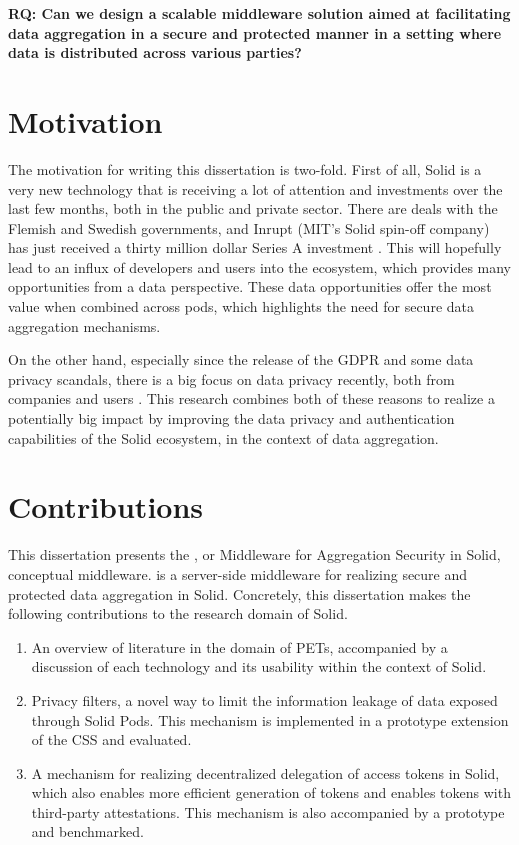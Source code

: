\noindent \textbf{RQ: Can we design a scalable middleware solution aimed at facilitating data aggregation in a secure and protected manner in a setting where data is distributed across various parties?
}

\section{Motivation}
\label{sec:motivation}
The motivation for writing this dissertation is two-fold. First of all, Solid is a very new technology that is receiving a lot of attention and investments over the last few months, both in the public and private sector. There are deals with the Flemish  and Swedish  governments, and Inrupt (MIT's Solid spin-off company) has just received a thirty million dollar Series A investment . This will hopefully lead to an influx of developers and users into the ecosystem, which provides many opportunities from a data perspective. These data opportunities offer the most value when combined across pods, which highlights the need for secure data aggregation mechanisms.

On the other hand, especially since the release of the GDPR and some data privacy scandals, there is a big focus on data privacy recently, both from companies and users . This research combines both of these reasons to realize a potentially big impact by improving the data privacy and authentication capabilities of the Solid  ecosystem, in the context of data aggregation. 

\section{Contributions}
\label{sec:contributions}
This dissertation presents the \middleware{}, or Middleware for Aggregation Security in Solid, conceptual middleware. \middleware{} is a server-side middleware for realizing secure and protected data aggregation in Solid. Concretely, this dissertation makes the following contributions to the research domain of Solid.
\begin{enumerate}
    \item An overview of literature in the domain of \acrlong{PETs}, accompanied by a discussion of each technology and its usability within the context of Solid.
    \item Privacy filters, a novel way to limit the information leakage of data exposed through Solid Pods. This mechanism is implemented in a prototype extension of the \acrlong{CSS} and evaluated.
    \item A mechanism for realizing decentralized delegation of access tokens in Solid, which also enables more efficient generation of tokens and enables tokens with third-party attestations. This mechanism is also accompanied by a prototype and benchmarked.
\end{enumerate}

